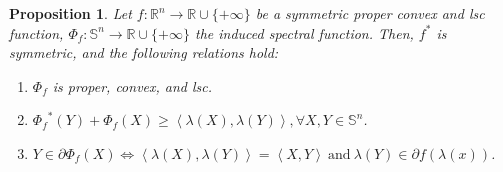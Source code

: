 \documentclass[a4paper,11pt, oneside]{book}
\newtheorem{prop}[thm]{Proposition}
\theoremstyle{definition}
\newcommand{\RealNumberSet}{\mathbb{R}}
\newcommand{\NDemenstionalRealEuclideanSpace}{\mathbb{R}^n}
\newcommand{\NDemenstionalRealSymmetricMatrixSpace}{\mathbb{S}^n}
\newcommand{\InnerProduct}[2]{\left\langle {#1},{#2}\right\rangle} %
\newcommand{\ExtendedRealValuedFunction}[2]{{#1}: {#2} \to \RealNumberSet \cup \{+\infty\}}
\newcommand{\ConjugateFunction}[1]{{#1}^*}
\begin{document}
\begin{prop}
  Let $\ExtendedRealValuedFunction{f}{\NDemenstionalRealEuclideanSpace}$ be a symmetric proper convex and lsc function, $\ExtendedRealValuedFunction{\Phi_f}{\NDemenstionalRealSymmetricMatrixSpace}$ the induced spectral function. Then, $\ConjugateFunction{f}$ is symmetric, and the following relations hold:
  \begin{enumerate}[label=\roman*,align=CenterWithParen]
    \item $\Phi_{f}$ is proper, convex, and lsc.
    \item $\ConjugateFunction{\Phi_f}(Y) + \Phi_f(X) \geq \InnerProduct{\lambda(X)}{\lambda(Y)}, \forall X,Y \in \NDemenstionalRealSymmetricMatrixSpace$.
    \item $Y \in \partial \Phi_f(X) \Leftrightarrow \InnerProduct{\lambda(X)}{\lambda(Y)} = \InnerProduct{X}{Y} \:\text{and}\: \lambda(Y) \in \partial f(\lambda(x))$.
  \end{enumerate}
\end{prop}
\end{document}
